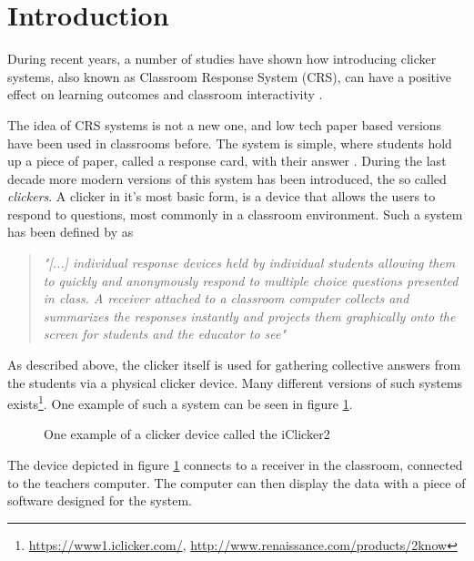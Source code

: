 \section{Introduction}
During recent years, a number of studies have shown how introducing clicker systems, also known as Classroom Response System (CRS), can have a positive effect on learning outcomes and classroom interactivity \cite{yourstone2008classroom, siau2006use, lantz2014effectiveness}.

The idea of CRS systems is not a new one, and low tech paper based versions have been used in classrooms before. The system is simple, where students hold up a piece of paper, called a response card, with their answer \cite{ralph1994effects}. During the last decade more modern versions of this system has been introduced, the so called \emph{clickers}. A clicker in it's most basic form, is a device that allows the users to respond to questions, most commonly in a classroom environment. Such a system has been defined by  as 

\begin{quote}
    \emph{"[...] individual response devices held by individual students allowing them to quickly and anonymously respond to multiple choice questions presented in class. A receiver attached to a classroom computer collects and summarizes the responses instantly and projects them graphically onto the screen for students and the educator to see"} \cite[p.~280]{lantz2014effectiveness}
\end{quote}

As described above, the clicker itself is used for gathering collective answers from the students via a physical clicker device. Many different versions of such systems exists\footnote{\url{https://www1.iclicker.com/}, \url{http://www.renaissance.com/products/2know}}. One example of such a system can be seen in figure \ref{fig:iclicker}.

\begin{figure}[H]
\capstart
	\centering
	\caption[iClicker2]{One example of a clicker device called the iClicker2 \label{fig:iclicker}}
\end{figure}

The device depicted in figure \ref{fig:iclicker} connects to a receiver in the classroom, connected to the teachers computer. The computer can then display the data with a piece of software designed for the system. 

